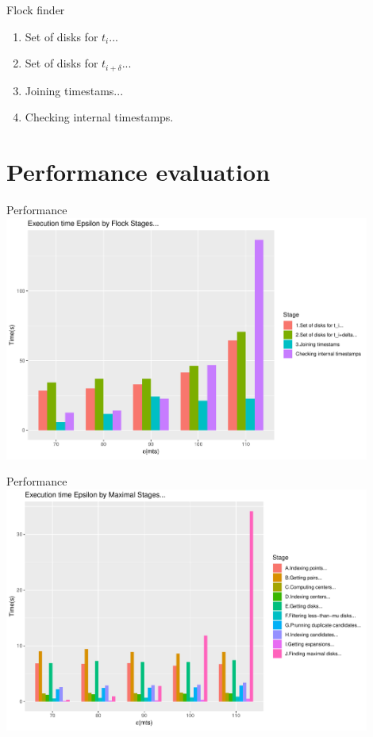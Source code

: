 \documentclass{beamer}
\theoremstyle{definition}
\begin{document}
\begin{frame}{Flock finder}
    \begin{enumerate}
        \item Set of disks for $t_i$...
        \item Set of disks for $t_{i+\delta}$...
        \item Joining timestams...
        \item Checking internal timestamps.
    \end{enumerate}
\end{frame}

\section{Performance evaluation}

\begin{frame}{Performance}
    \centering
    \includegraphics[width=0.9\textwidth]{MergeLastFlocksByStage}
\end{frame}

\begin{frame}{Performance}
    \centering
    \includegraphics[width=0.9\textwidth]{MergeLastMaximalsByStage}
\end{frame}
\end{document}
